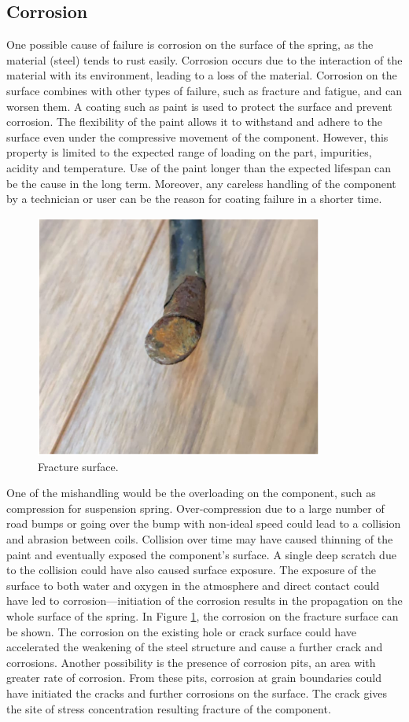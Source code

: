 \documentclass[11pt]{article}
\begin{document}
\subsection{Corrosion}
One possible cause of failure is corrosion on the surface of the spring, as the material (steel) tends to rust easily. Corrosion occurs due to the interaction of the material with its environment, leading to a loss of the material. Corrosion on the surface combines with other types of failure, such as fracture and fatigue, and can worsen them. A coating such as paint is used to protect the surface and prevent corrosion. The flexibility of the paint allows it to withstand and adhere to the surface even under the compressive movement of the component. However, this property is limited to the expected range of loading on the part, impurities, acidity and temperature. Use of the paint longer than the expected lifespan can be the cause in the long term. Moreover, any careless handling of the component by a technician or user can be the reason for coating failure in a shorter time.  
  \begin{figure}[H]
    \centering
    \includegraphics[height = 8cm]{./img/fracture1.png}
    \caption{Fracture surface.}
    \label{fig:fracture1}
\end{figure}
One of the mishandling would be the overloading on the component, such as compression for suspension spring. Over-compression due to a large number of road bumps or going over the bump with non-ideal speed could lead to a collision and abrasion between coils. Collision over time may have caused thinning of the paint and eventually exposed the component’s surface. A single deep scratch due to the collision could have also caused surface exposure. The exposure of the surface to both water and oxygen in the atmosphere and direct contact could have led to corrosion—initiation of the corrosion results in the propagation on the whole surface of the spring. In Figure \ref{fig:fracture1}, the corrosion on the fracture surface can be shown. The corrosion on the existing hole or crack surface could have accelerated the weakening of the steel structure and cause a further crack and corrosions. Another possibility is the presence of corrosion pits, an area with greater rate of corrosion. From these pits, corrosion at grain boundaries could have initiated the cracks and further corrosions on the surface. The crack gives the site of stress concentration resulting fracture of the component. 
\end{document}
